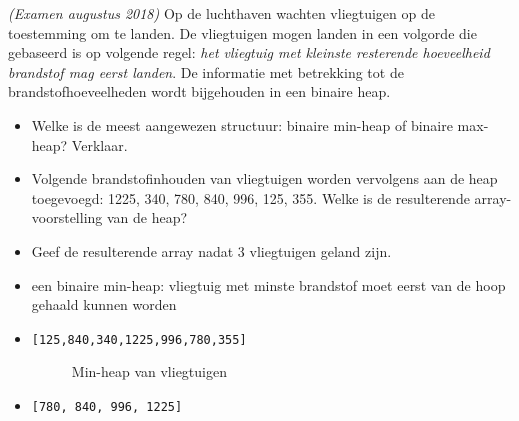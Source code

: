 \begin{oef}
\papier \emph{(Examen augustus 2018)} Op de luchthaven wachten vliegtuigen op de toestemming om te landen. De vliegtuigen mogen landen in een volgorde die gebaseerd is op volgende regel: \emph{het vliegtuig met kleinste resterende hoeveelheid brandstof mag eerst landen}. De informatie met betrekking tot de brandstofhoeveelheden wordt bijgehouden in een binaire heap.

\begin{itemize}	
\item Welke is de meest aangewezen structuur: binaire min-heap of binaire max-heap?
Verklaar.




\item Volgende brandstofinhouden van vliegtuigen worden vervolgens aan de heap toegevoegd:
1225, 340, 780, 840, 996, 125, 355. Welke is de resulterende array-voorstelling van de heap?


\item Geef de resulterende array nadat 3 vliegtuigen geland zijn.

\end{itemize}	
\begin{opl}
\begin{itemize}
\item een binaire min-heap: vliegtuig met minste brandstof moet eerst van de hoop gehaald kunnen worden
\item \verb/[125,840,340,1225,996,780,355]/

\begin{figure}[htbp]
    \centering
{}
\caption{Min-heap van vliegtuigen}
\end{figure}
\item \verb/[780, 840, 996, 1225]/
\end{itemize}
\end{opl}
\end{oef}


